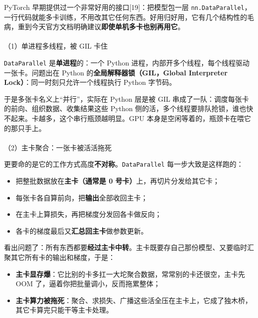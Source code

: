 \documentclass[
  chinese,
]{ctexart}
\makeatletter
\let\oldparagraph\paragraph
\renewcommand{\paragraph}{
    \@ifstar
      \xxxParagraphStar
      \xxxParagraphNoStar
  }
\newcommand{\xxxParagraphStar}[1]{\oldparagraph*{#1}\mbox{}}
\newcommand{\xxxParagraphNoStar}[1]{\oldparagraph{#1}\mbox{}}
\providecommand{\tightlist}{%
  \setlength{\itemsep}{0pt}\setlength{\parskip}{0pt}}
\makeatother
\begin{document}
PyTorch 早期提供过一个非常好用的接口{[}19{]}：把模型包一层
\texttt{nn.DataParallel}，一行代码就能多卡训练，不用改其它任何东西。好用归好用，它有几个结构性的毛病，重到今天官方文档明确建议\textbf{即使单机多卡也别再用它}。

\paragraph{（1）单进程多线程，被 GIL
卡住}\label{ux5355ux8fdbux7a0bux591aux7ebfux7a0bux88ab-gil-ux5361ux4f4f}

\texttt{DataParallel} 是\textbf{单进程}的：一个 Python
进程，内部开多个线程，每个线程驱动一张卡。问题出在 Python
的\textbf{全局解释器锁（GIL，Global Interpreter
Lock）}：同一时刻只允许一个线程执行 Python 字节码。

于是多张卡名义上``并行''，实际在 Python 层是被 GIL
串成了一队：调度每张卡的前向、组织数据、收集结果这些 Python
侧的活，多个线程要排队抢锁，谁也快不起来。卡越多，这个串行瓶颈越明显。GPU
本身是空闲等着的，瓶颈卡在喂它的那只手上。

\paragraph{（2）主卡聚合：一张卡被活活拖死}\label{ux4e3bux5361ux805aux5408ux4e00ux5f20ux5361ux88abux6d3bux6d3bux62d6ux6b7b}

更要命的是它的工作方式高度\textbf{不对称}。\texttt{DataParallel}
每一步大致是这样跑的：

\begin{itemize}
\tightlist
\item
  把整批数据放在\textbf{主卡（通常是 0 号卡）}上，再切片分发给其它卡；
\item
  每张卡各自算前向，把\textbf{输出}全部收回主卡；
\item
  在主卡上算损失，再把梯度分发回各卡做反向；
\item
  各卡的梯度最后又\textbf{汇总回主卡}做参数更新。
\end{itemize}

看出问题了：所有东西都要\textbf{经过主卡中转}。主卡既要存自己那份模型、又要临时汇聚其它所有卡的输出和梯度，于是：

\begin{itemize}
\tightlist
\item
  \textbf{主卡显存爆}：它比别的卡多扛一大坨聚合数据，常常别的卡还很空，主卡先
  OOM 了，逼着你把批量调小，反而拖累整体；
\item
  \textbf{主卡算力被拖死}：聚合、求损失、广播这些活全压在主卡上，它成了独木桥，其它卡算完只能干等主卡处理。
\end{itemize}
\end{document}
